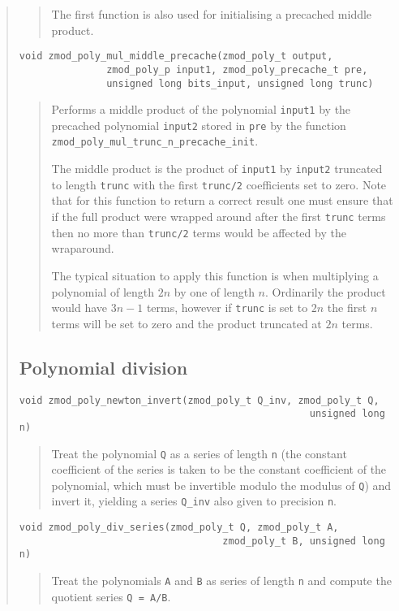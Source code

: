 \documentclass[a4paper,10pt]{article}
\newcommand{\code}{\lstinline}
\begin{document}
\begin{quote}
\begin{quote}
The first function is also used for initialising a precached middle product. 
\end{quote}

\begin{lstlisting}
void zmod_poly_mul_middle_precache(zmod_poly_t output,
               zmod_poly_p input1, zmod_poly_precache_t pre,
               unsigned long bits_input, unsigned long trunc)
\end{lstlisting}
\begin{quote}
Performs a middle product of the polynomial \code{input1} by the precached polynomial \code{input2} stored in \code{pre} by the function \code{zmod_poly_mul_trunc_n_precache_init}. 

The middle product is the product of \code{input1} by \code{input2} truncated to length \code{trunc} with the first \code{trunc/2} coefficients set to zero. Note that for this function to return a correct result one must ensure that if the full product were wrapped around after the first \code{trunc} terms then no more than \code{trunc/2} terms would be affected by the wraparound. 

The typical situation to apply this function is when multiplying a polynomial of length $2n$ by one of length $n$. Ordinarily the product would have $3n - 1$ terms, however if \code{trunc} is set to $2n$ the first $n$ terms will be set to zero and the product truncated at $2n$ terms.  
\end{quote}

\subsection{Polynomial division}
\begin{lstlisting}
void zmod_poly_newton_invert(zmod_poly_t Q_inv, zmod_poly_t Q, 
                                                  unsigned long n)
\end{lstlisting}
\begin{quote}
Treat the polynomial \code{Q} as a series of length \code{n} (the constant coefficient of the series is taken to be the constant coefficient of the polynomial, which must be invertible modulo the modulus of \code{Q}) and invert it, yielding a series \code{Q_inv} also given to precision \code{n}. 
\end{quote}

\begin{lstlisting}
void zmod_poly_div_series(zmod_poly_t Q, zmod_poly_t A, 
                                   zmod_poly_t B, unsigned long n)
\end{lstlisting}
\begin{quote}
Treat the polynomials \code{A} and \code{B} as series of length \code{n} and compute the quotient series \code{Q = A/B}.
\end{quote}


\end{quote}
\end{document}
